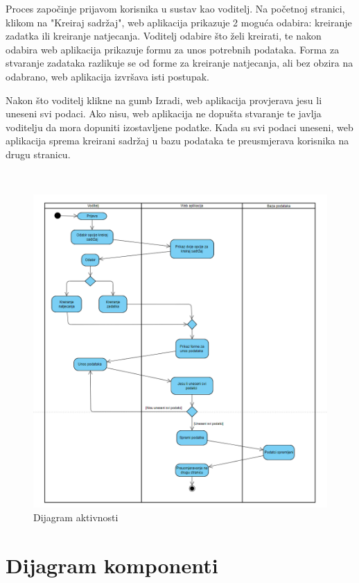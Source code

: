 {{			Proces započinje prijavom korisnika u sustav kao voditelj. Na početnoj stranici, klikom na "Kreiraj sadržaj", web aplikacija prikazuje 2 moguća odabira: kreiranje zadatka ili kreiranje natjecanja. Voditelj odabire što želi kreirati, te nakon odabira web aplikacija prikazuje formu za unos potrebnih podataka. Forma za stvaranje zadataka razlikuje se od forme za kreiranje natjecanja, ali bez obzira na odabrano, web aplikacija izvršava isti postupak.
			
			Nakon što voditelj klikne na gumb Izradi, web aplikacija provjerava jesu li uneseni svi podaci. Ako nisu, web aplikacija ne dopušta stvaranje te javlja voditelju da mora dopuniti izostavljene podatke. Kada su svi podaci uneseni, web aplikacija sprema kreirani sadržaj u bazu podataka te preusmjerava korisnika na drugu stranicu.  
		}\\
		
			
		\begin{figure}[H]
			\includegraphics[scale=0.5]{slike/dijagram aktivnosti}
			\centering
			\caption{Dijagram aktivnosti}
			\label{fig:dijagramaktivnosti}
		\end{figure}
			
			\eject
		\section{Dijagram komponenti}
		
}

